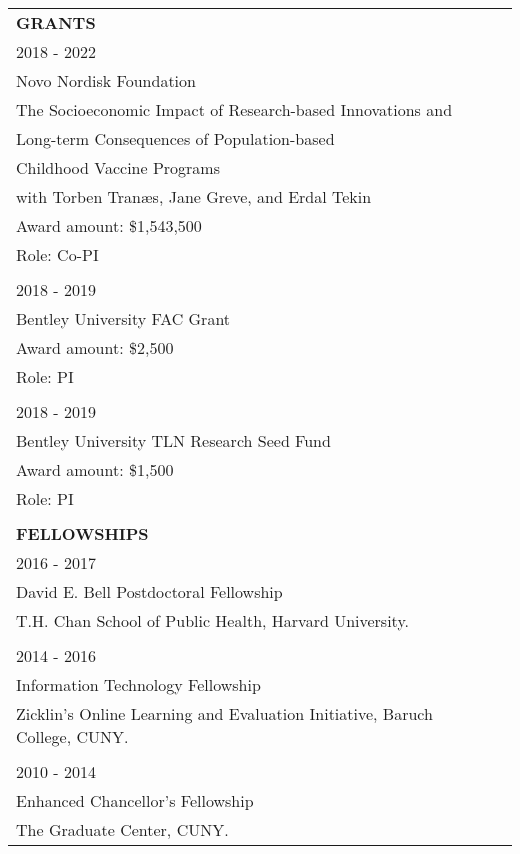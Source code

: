 \documentclass[12 pt]{article}
\begin{document}
\begin{longtable}{ccccc}
 \multicolumn{5}{l}{\textbf{GRANTS}}\\[2 pt]
 \multicolumn{4}{l}{2018 - 2022} \\
 \multicolumn{4}{l}{Novo Nordisk Foundation}  \\
\multicolumn{4}{l}{The Socioeconomic Impact of Research-based Innovations and }  \\
  \multicolumn{4}{l}{Long-term Consequences of Population-based} \\
  \multicolumn{4}{l}{Childhood Vaccine Programs }  \\
  \multicolumn{4}{l}{with Torben Tran{\ae}s, Jane Greve, and Erdal Tekin}  \\
  \multicolumn{4}{l}{Award amount: \$1,543,500 }  \\
    \multicolumn{4}{l}{Role: Co-PI}  \\
  \\
 \multicolumn{4}{l}{2018 - 2019} \\
 \multicolumn{4}{l}{Bentley University FAC Grant} \\
\multicolumn{4}{l}{Award amount: \$2,500}  \\
    \multicolumn{4}{l}{Role: PI}  \\
\\
 \multicolumn{4}{l}{2018 - 2019} \\
 \multicolumn{4}{l}{Bentley University TLN Research Seed Fund} \\
\multicolumn{4}{l}{Award amount: \$1,500}  \\
    \multicolumn{4}{l}{Role: PI}  \\
\\



 \multicolumn{5}{l}{\textbf{FELLOWSHIPS}}\\[2 pt] 
 \multicolumn{4}{l}{2016 - 2017} \\
 \multicolumn{4}{l}{David E. Bell Postdoctoral Fellowship} \\
\multicolumn{4}{l}{T.H. Chan School of Public Health, Harvard University.}   \\
\\
 \multicolumn{4}{l}{2014 - 2016} \\
 \multicolumn{4}{l}{Information Technology Fellowship} \\
\multicolumn{4}{l}{Zicklin's Online Learning and Evaluation Initiative, Baruch College, CUNY.}   \\
\\
 \multicolumn{4}{l}{2010 - 2014} \\
 \multicolumn{4}{l}{Enhanced Chancellor's Fellowship}  \\
\multicolumn{4}{l}{The Graduate Center, CUNY.}   \\


\end{longtable}
\end{document}
